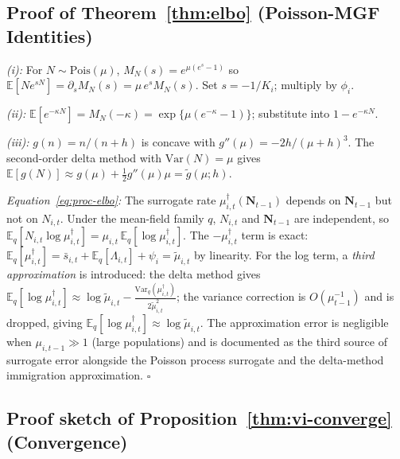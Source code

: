 \documentclass[review,12pt]{elsarticle}
\theoremstyle{definition}
\begin{document}
\subsection*{Proof of Theorem~\ref{thm:elbo} (Poisson-MGF Identities)}

\textit{(i):} For $N\sim\mathrm{Pois}(\mu)$, $M_N(s)=e^{\mu(e^s-1)}$ so
$\mathbb{E}[Ne^{sN}]=\partial_s M_N(s)=\mu\,e^s M_N(s)$.
Set $s=-1/K_i$; multiply by $\phi_i$.

\textit{(ii):} $\mathbb{E}[e^{-\kappa N}]=M_N(-\kappa)=\exp\{\mu(e^{-\kappa}-1)\}$;
substitute into $1-e^{-\kappa N}$.

\textit{(iii):} $g(n)=n/(n+h)$ is concave with $g''(\mu)=-2h/(\mu+h)^3$.
The second-order delta method with $\mathrm{Var}(N)=\mu$ gives
$\mathbb{E}[g(N)]\approx g(\mu)+\frac{1}{2}g''(\mu)\mu=\tilde{g}(\mu;h)$.

\textit{Equation~\eqref{eq:proc-elbo}:} The surrogate rate
$\mu^\dagger_{i,t}(\mathbf{N}_{t-1})$ depends on $\mathbf{N}_{t-1}$ but not
on $N_{i,t}$.  Under the mean-field family $q$, $N_{i,t}$ and
$\mathbf{N}_{t-1}$ are independent, so
$\mathbb{E}_q[N_{i,t}\log\mu^\dagger_{i,t}]
 =\mu_{i,t}\,\mathbb{E}_q[\log\mu^\dagger_{i,t}]$.
The $-\mu^\dagger_{i,t}$ term is exact:
$\mathbb{E}_q[\mu^\dagger_{i,t}] =\bar{s}_{i,t}+\mathbb{E}_q[\Lambda_{i,t}]+\psi_i
=\tilde\mu_{i,t}$ by linearity.
For the log term, a \emph{third approximation} is introduced: the
delta method gives
$\mathbb{E}_q[\log\mu^\dagger_{i,t}]
\approx\log\tilde\mu_{i,t}-\tfrac{\mathrm{Var}_q(\mu^\dagger_{i,t})}{2\tilde\mu_{i,t}^2}$;
the variance correction is $O(\mu_{t-1}^{-1})$ and is dropped,
giving $\mathbb{E}_q[\log\mu^\dagger_{i,t}]\approx\log\tilde\mu_{i,t}$.
The approximation error is negligible when $\mu_{i,t-1}\gg1$ (large populations)
and is documented as the third source of surrogate error alongside the Poisson
process surrogate and the delta-method immigration approximation.
\hfill$\square$

\subsection*{Proof sketch of Proposition~\ref{thm:vi-converge} (Convergence)}
\end{document}
